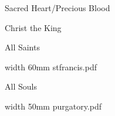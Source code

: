 

\paginaproxima


\bigskip



\bigskip

\eject


\paginaproxima

\beginpart Sacred Heart/Precious Blood



\bigskip



\bigskip



\eject

\beginpart Christ the King


\bigskip




%

\bigskip


\eject

\beginpart All Saints



\bigskip



\eject



\bigskip

\saveimageresource width 60mm {stfrancis.pdf}

\centerline{\useimageresource \lastsavedimageresourceindex}



\eject

\beginpart All Souls



\paginaproxima


\bigskip

\saveimageresource width 50mm {purgatory.pdf}

